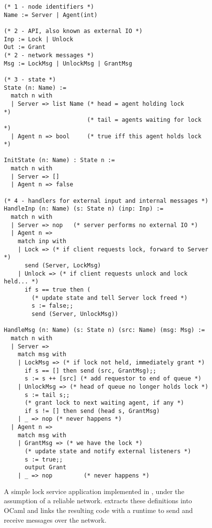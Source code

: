 
\begin{figure}[p]

\begin{lstlisting}[language=caml,basicstyle=\scriptsize\tt,morekeywords={output,send,nop}]
(* 1 - node identifiers *)
Name := Server | Agent(int)

(* 2 - API, also known as external IO *)
Inp := Lock | Unlock
Out := Grant
(* 2 - network messages *)
Msg := LockMsg | UnlockMsg | GrantMsg

(* 3 - state *)
State (n: Name) :=
  match n with
  | Server => list Name (* head = agent holding lock      *)
                        (* tail = agents waiting for lock *)
  | Agent n => bool     (* true iff this agent holds lock *)

InitState (n: Name) : State n :=
  match n with
  | Server => []
  | Agent n => false

(* 4 - handlers for external input and internal messages *)
HandleInp (n: Name) (s: State n) (inp: Inp) :=
  match n with
  | Server => nop   (* server performs no external IO *)
  | Agent n =>
    match inp with
    | Lock => (* if client requests lock, forward to Server *)
      send (Server, LockMsg)
    | Unlock => (* if client requests unlock and lock held... *)
      if s == true then (
        (* update state and tell Server lock freed *)
        s := false;;
        send (Server, UnlockMsg))

HandleMsg (n: Name) (s: State n) (src: Name) (msg: Msg) :=
  match n with
  | Server =>
    match msg with
    | LockMsg => (* if lock not held, immediately grant *)
      if s == [] then send (src, GrantMsg);;
      s := s ++ [src] (* add requestor to end of queue *)
    | UnlockMsg => (* head of queue no longer holds lock *)
      s := tail s;;
      (* grant lock to next waiting agent, if any *)
      if s != [] then send (head s, GrantMsg)
    | _ => nop (* never happens *)
  | Agent n =>
    match msg with
    | GrantMsg => (* we have the lock *)
      (* update state and notify external listeners *)
      s := true;;
      output Grant
    | _ => nop         (* never happens *)
\end{lstlisting}

\caption{A simple lock service application implemented in \Verdi, under the
  assumption of a reliable network.  \Verdi extracts these definitions into
  OCaml and links the resulting code with a runtime to send and receive
  messages over the network.}
\label{fig:lock-service-code}
\end{figure}

